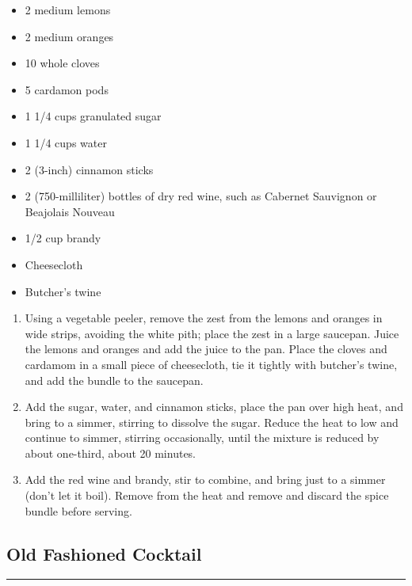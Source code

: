 \documentclass{article}
\begin{document}
\begin{framed}
    \begin{itemize}
        \item 2 medium lemons
        \item 2 medium oranges
        \item 10 whole cloves
        \item 5 cardamon pods
        \item 1 1/4 cups granulated sugar
        \item 1 1/4 cups water
        \item 2 (3-inch) cinnamon sticks
        \item 2 (750-milliliter) bottles of dry red wine, such as Cabernet Sauvignon or Beajolais Nouveau
        \item 1/2 cup brandy
        \item Cheesecloth
        \item Butcher's twine
    \end{itemize}
\end{framed}

\begin{enumerate}
    \item 
        Using a vegetable peeler, remove the zest from the lemons and oranges in wide strips, avoiding the white pith; place the zest in a large saucepan. Juice the lemons and oranges and add the juice to the pan. Place the cloves and cardamom in a small piece of cheesecloth, tie it tightly with butcher’s twine, and add the bundle to the saucepan.
    \item 
        Add the sugar, water, and cinnamon sticks, place the pan over high heat, and bring to a simmer, stirring to dissolve the sugar. Reduce the heat to low and continue to simmer, stirring occasionally, until the mixture is reduced by about one-third, about 20 minutes.
    \item 
        Add the red wine and brandy, stir to combine, and bring just to a simmer (don’t let it boil). Remove from the heat and remove and discard the spice bundle before serving.
\end{enumerate}
\newpage

\subsection{Old Fashioned Cocktail} 
\noindent\rule[0.5ex]{\linewidth}{1pt}
\end{document}
